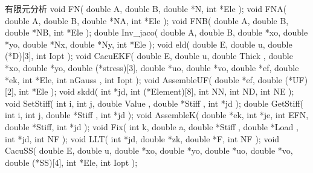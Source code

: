 \documentclass[color=orange]{textbook-cn}%
\begin{document}
\begin{Exercise}
\begin{QsNum}
\item \lipsum[1][1-2]
\item \lipsum[1][1-2]
\item \lipsum[1][1-2]
\item \lipsum[1][1-2]
\item \lipsum[1][1-2]
\item \lipsum[1][1-2]
\item \lipsum[1][1-2]
\item \lipsum[1][1-2]
\end{QsNum}
\begin{QsNum}
\item \lipsum[1][1-2]
\item \lipsum[1][1-2]
\item \lipsum[1][1-2]
\item \lipsum[1][1-2]
\item \lipsum[1][1-2]
\end{QsNum}
\begin{QsNum}
\item \lipsum[1][1-2]
\item \lipsum[1][1-2]
\item \lipsum[1][1-2]
\item \lipsum[1][1-2]
\item \lipsum[1][1-2]
\item \lipsum[1][1-2]
\item \lipsum[1][1-2]
\item \lipsum[1][1-2]
\end{QsNum}
\tcblower
\lipsum[1]
\end{Exercise}




\begin{CppBox}{有限元分析}
void FN( double A, double B, double *N, int *Ele );
void FNA( double A, double B, double *NA, int *Ele );
void FNB( double A, double B, double *NB, int *Ele );
double Inv_jaco( double A, double B, double *xo, double *yo, double *Nx, double *Ny, int *Ele );
void eld( double E, double u, double (*D)[3], int Iopt );
void CacuEKF( double E, double u, double Thick , double *xo, double *yo, double (*stress)[3], double *uo, double *vo, double *ef, double *ek, int *Ele, int nGauss , int Iopt );
void AssembleUF( double *ef, double (*UF)[2], int *Ele );
void skdd( int *jd, int (*Element)[8], int NN, int ND, int NE );
void SetStiff( int i, int j, double Value , double *Stiff , int *jd );
double GetStiff( int i, int j, double *Stiff , int *jd );
void AssembleK( double *ek, int *je, int EFN, double *Stiff, int *jd );
void Fix( int k, double a, double *Stiff , double *Load , int *jd, int NF );
void LLT( int *jd, double *zk, double *F, int NF );
void CacuSS( double E, double u, double *xo, double *yo, double *uo, double *vo, double (*SS)[4], int *Ele, int Iopt );
\end{CppBox}
\end{document}
